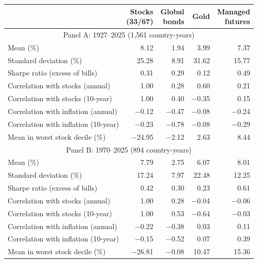 \begin{table}[p]
{\small\begin{tabular}{lrrrr}\toprule
 & \shortstack{Stocks\\ (33/67)} & \shortstack{Global\\ bonds} & Gold & \shortstack{Managed\\ futures} \\ \midrule
\multicolumn{5}{c}{Panel A: 1927--2025 (1,561 country-years)} \\
Mean (\%) & 8.12 & 1.94 & 3.99 & 7.37 \\
Standard deviation (\%) & 25.28 & 8.91 & 31.62 & 15.77 \\
Sharpe ratio (excess of bills) & 0.31 & 0.29 & 0.12 & 0.49 \\
Correlation with stocks (annual) & 1.00 & 0.28 & 0.60 & 0.21 \\
Correlation with stocks (10-year) & 1.00 & 0.40 & $-$0.35 & 0.15 \\
Correlation with inflation (annual) & $-$0.12 & $-$0.47 & $-$0.08 & $-$0.24 \\
Correlation with inflation (10-year) & $-$0.23 & $-$0.78 & $-$0.08 & $-$0.29 \\
Mean in worst stock decile (\%) & $-$24.95 & $-$2.12 & 2.63 & 8.44 \\
\multicolumn{5}{c}{Panel B: 1970--2025 (894 country-years)} \\
Mean (\%) & 7.79 & 2.75 & 6.07 & 8.01 \\
Standard deviation (\%) & 17.24 & 7.97 & 22.48 & 12.25 \\
Sharpe ratio (excess of bills) & 0.42 & 0.30 & 0.23 & 0.61 \\
Correlation with stocks (annual) & 1.00 & 0.28 & $-$0.04 & $-$0.06 \\
Correlation with stocks (10-year) & 1.00 & 0.53 & $-$0.64 & $-$0.03 \\
Correlation with inflation (annual) & $-$0.22 & $-$0.38 & 0.03 & 0.11 \\
Correlation with inflation (10-year) & $-$0.15 & $-$0.52 & 0.07 & 0.39 \\
Mean in worst stock decile (\%) & $-$26.81 & $-$0.08 & 10.47 & 15.36 \\
\bottomrule\end{tabular}}
\end{table}
